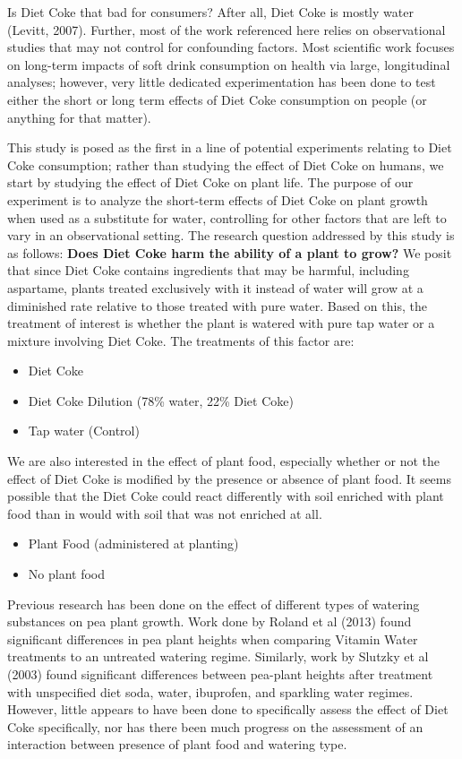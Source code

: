 \documentclass[1p,12pt]{elsarticle}\usepackage[]{graphicx}\usepackage[]{color}
\begin{document}
Is Diet Coke that bad for consumers? After all, Diet Coke is mostly water (Levitt, 2007). Further, most of the work referenced here relies on observational studies that may not control for confounding factors.  Most scientific work focuses on long-term impacts of soft drink consumption on health via large, longitudinal analyses; however, very little dedicated experimentation has been done to test either the short or long term effects of Diet Coke consumption on people (or anything for that matter). 

This study is posed as the first in a line of potential experiments relating to Diet Coke consumption; rather than studying the effect of Diet Coke on humans, we start by studying the effect of Diet Coke on plant life. The purpose of our experiment is to analyze the short-term effects of Diet Coke on plant growth when used as a substitute for water, controlling for other factors that are left to vary in an observational setting. The research question addressed by this study is as follows: \textbf{Does Diet Coke harm the ability of a plant to grow?} We posit that since Diet Coke contains ingredients that may be harmful, including aspartame, plants treated exclusively with it instead of water will grow at a diminished rate relative to those treated with pure water. Based on this, the treatment of interest is whether the plant is watered with pure tap water or a mixture involving Diet Coke.  The treatments of this factor are:

\begin{itemize}
\item Diet Coke
\item Diet Coke Dilution (78\% water, 22\% Diet Coke)
\item Tap water (Control)
\end{itemize}

We are also interested in the effect of plant food,  especially whether or not the effect of Diet Coke is modified by the presence or absence of plant food.  It seems possible that the Diet Coke could react differently with soil enriched with plant food than in would with soil that was not enriched at all. 

\begin{itemize}
\item Plant Food (administered at planting)
\item No plant food
\end{itemize}

Previous research has been done on the effect of different types of watering substances on pea plant growth. Work done by Roland et al (2013) found significant differences in pea plant heights when comparing Vitamin Water treatments to an untreated watering regime. Similarly, work by Slutzky et al (2003) found significant differences between pea-plant heights after treatment with unspecified diet soda, water, ibuprofen, and sparkling water regimes. However, little appears to have been done to specifically assess the effect of Diet Coke specifically, nor has there been much progress on the assessment of an interaction between presence of plant food and watering type.   
\end{document}
